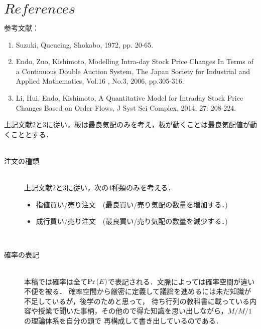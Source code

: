 \documentclass[a4j,papersize,disablejfam,slide,14pt]{jsarticle}
\def\prob#1{\mbox{${\rm Pr} \left( #1 \right)$}} %
\begin{document}
\section{$References$}
	参考文献：
    \begin{enumerate}
    	\item Suzuki, Queueing, Shokabo, 1972, pp. 20-65.
        \item Endo, Zuo, Kishimoto, 
        Modelling Intra-day Stock Price Changes In Terms of
        a Continuous Double Auction System, 
        The Japan Society for Industrial and Applied Mathematics, 
        Vol.16 , No.3, 2006, pp.305-316.
        \item Li, Hui, Endo, Kishimoto, A Quantitative Model for Intraday Stock Price
         Changes Based on Order Flows, 
         J Syst Sci Complex, 2014, 27: 208-224.
    \end{enumerate}
    上記文献$2$と$3$に従い，板は最良気配のみを考え，板が動くことは最良気配値が動くこととする．\\\\
    \begin{description}
    	\item[注文の種類]\mbox{}\\
     	上記文献$2$と$3$に従い，次の4種類のみを考える．
    	\begin{itemize}
    		\item 指値買い/売り注文　(最良買い/売り気配の数量を増加する．)
        	\item 成行買い/売り注文　(最良買い/売り気配の数量を減少する．)
    	\end{itemize}
        \mbox{}\\
        \item[確率の表記]\mbox{}\\
        	本稿では確率は全て$\prob{E}$で表記される．文脈によっては確率空間が違い不便を被る．
            確率空間から厳密に定義して議論を進めるには未だ知識が不足しているが，後学のためと思って，
            待ち行列の教科書に載っている内容や授業で聞いた事柄，その他ので得た知識を思い出しながら，$M/M/1$の理論体系を自分の頭で
            再構成して書き出しているのである．
     \end{description}
\end{document}
